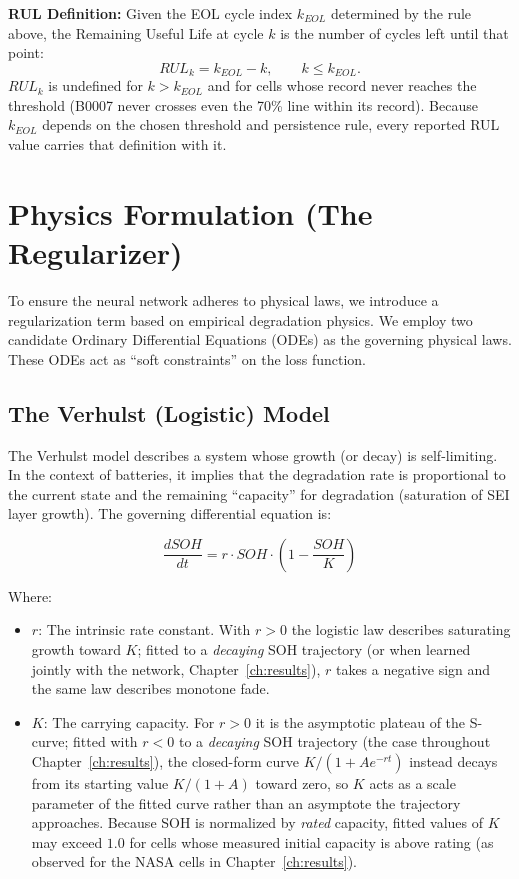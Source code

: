 \textbf{RUL Definition:} Given the EOL cycle index $k_{EOL}$ determined by the rule above, the Remaining Useful Life at cycle $k$ is the number of cycles left until that point:
\begin{equation}
    RUL_k = k_{EOL} - k, \qquad k \leq k_{EOL}.
\end{equation}
$RUL_k$ is undefined for $k > k_{EOL}$ and for cells whose record never reaches the threshold (B0007 never crosses even the 70\% line within its record). Because $k_{EOL}$ depends on the chosen threshold and persistence rule, every reported RUL value carries that definition with it.

\section{Physics Formulation (The Regularizer)}
\label{sec:physics_formulation}

To ensure the neural network adheres to physical laws, we introduce a regularization term based on empirical degradation physics. We employ two candidate Ordinary Differential Equations (ODEs) as the governing physical laws. These ODEs act as ``soft constraints'' on the loss function.

\subsection{The Verhulst (Logistic) Model}

The Verhulst model describes a system whose growth (or decay) is self-limiting. In the context of batteries, it implies that the degradation rate is proportional to the current state and the remaining ``capacity'' for degradation (saturation of SEI layer growth). The governing differential equation is:

\begin{equation}
    \frac{dSOH}{dt} = r \cdot SOH \cdot \left( 1 - \frac{SOH}{K} \right)
\end{equation}

Where:
\begin{itemize}
    \item $r$: The intrinsic rate constant. With $r>0$ the logistic law describes saturating growth toward $K$; fitted to a \emph{decaying} SOH trajectory (or when learned jointly with the network, Chapter~\ref{ch:results}), $r$ takes a negative sign and the same law describes monotone fade.
    \item $K$: The carrying capacity. For $r>0$ it is the asymptotic plateau of the S-curve; fitted with $r<0$ to a \emph{decaying} SOH trajectory (the case throughout Chapter~\ref{ch:results}), the closed-form curve $K/(1+A e^{-rt})$ instead decays from its starting value $K/(1+A)$ toward zero, so $K$ acts as a scale parameter of the fitted curve rather than an asymptote the trajectory approaches. Because SOH is normalized by \emph{rated} capacity, fitted values of $K$ may exceed $1.0$ for cells whose measured initial capacity is above rating (as observed for the NASA cells in Chapter~\ref{ch:results}).
\end{itemize}

